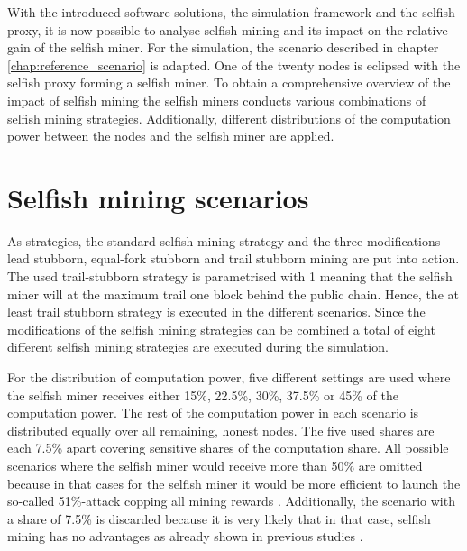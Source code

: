 With the introduced software solutions, the simulation framework and the selfish proxy, it is now possible to analyse selfish mining and its impact on the relative gain of the selfish miner.
For the simulation, the scenario described in chapter \ref{chap:reference_scenario} is adapted.
One of the twenty nodes is eclipsed with the selfish proxy forming a selfish miner.
To obtain a comprehensive overview of the impact of selfish mining the selfish miners conducts various combinations of selfish mining strategies.
Additionally, different distributions of the computation power between the nodes and the selfish miner are applied.

\section{Selfish mining scenarios}

As strategies, the standard selfish mining strategy and the three modifications lead stubborn, equal-fork stubborn and trail stubborn mining are put into action.
The used trail-stubborn strategy is parametrised with 1 meaning that the selfish miner will at the maximum trail one block behind the public chain.
Hence, the at least trail stubborn strategy is executed in the different scenarios.
Since the modifications of the selfish mining strategies can be combined a total of eight different selfish mining strategies are executed during the simulation.

For the distribution of computation power, five different settings are used where the selfish miner receives either 15\%, 22.5\%, 30\%, 37.5\% or 45\% of the computation power.
The rest of the computation power in each scenario is distributed equally over all remaining, honest nodes.
The five used shares are each 7.5\% apart covering sensitive shares of the computation share.
All possible scenarios where the selfish miner would receive more than 50\% are omitted because in that cases for the selfish miner it would be more efficient to launch the so-called 51\%-attack copping all mining rewards \cite{nakamoto2008bitcoin, clarkresearch, tschorsch2016bitcoin}.
Additionally, the scenario with a share of 7.5\% is discarded because it is very likely that in that case, selfish mining has no advantages as already shown in previous studies \cite{eyal2014majority, sapirshtein2016optimal, nayak2016stubborn}.

